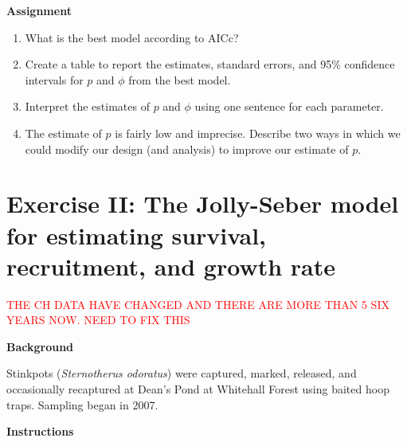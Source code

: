 \documentclass[12pt]{article}
\begin{document}
{\bf Assignment}

\begin{enumerate}
  \item What is the best model according to AICc?
  \item Create a table to report the estimates, standard errors, and
    95\% confidence intervals for $p$ and $\phi$ from the best model.
  \item Interpret the estimates of $p$ and $\phi$ using one sentence
    for each parameter.
  \item The estimate of $p$ is fairly low and imprecise. Describe two
    ways in which we could modify our design (and analysis) to improve
    our estimate of $p$.  
\end{enumerate}

  
\clearpage

\section*{\large  Exercise II: The Jolly-Seber model for estimating
  survival, recruitment, and growth rate}

\textcolor{red}{THE CH DATA HAVE CHANGED AND THERE ARE MORE THAN 5 SIX
  YEARS NOW. NEED TO FIX THIS}

{\bf Background}

Stinkpots ({\it Sternotherus odoratus}) were captured, marked,
released, and occasionally recaptured at Dean's Pond at
Whitehall Forest using baited hoop traps. Sampling began in 2007.


{\bf Instructions}
\end{document}
